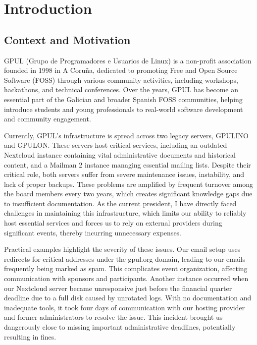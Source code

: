 %

\chapter{Introduction}
\label{chap:introducion}

\section{Context and Motivation}

GPUL (Grupo de Programadores e Usuarios de Linux) \cite{gpul_web} is a non-profit association founded in 1998 in A Coruña, dedicated to promoting Free and Open Source Software (FOSS) through various community activities, including workshops, hackathons, and technical conferences. Over the years, GPUL has become an essential part of the Galician and broader Spanish FOSS communities, helping introduce students and young professionals to real-world software development and community engagement.

Currently, GPUL's infrastructure is spread across two legacy servers, GPULINO and GPULON. These servers host critical services, including an outdated Nextcloud instance containing vital administrative documents and historical content, and a Mailman 2 instance managing essential mailing lists. Despite their critical role, both servers suffer from severe maintenance issues, instability, and lack of proper backups. These problems are amplified by frequent turnover among the board members every two years, which creates significant knowledge gaps due to insufficient documentation. As the current president, I have directly faced challenges in maintaining this infrastructure, which limits our ability to reliably host essential services and forces us to rely on external providers during significant events, thereby incurring unnecessary expenses.

Practical examples highlight the severity of these issues. Our email setup uses redirects for critical addresses under the gpul.org domain, leading to our emails frequently being marked as spam. This complicates event organization, affecting communication with sponsors and participants. Another instance occurred when our Nextcloud server became unresponsive just before the financial quarter deadline due to a full disk caused by unrotated logs. With no documentation and inadequate tools, it took four days of communication with our hosting provider and former administrators to resolve the issue. This incident brought us dangerously close to missing important administrative deadlines, potentially resulting in fines.

